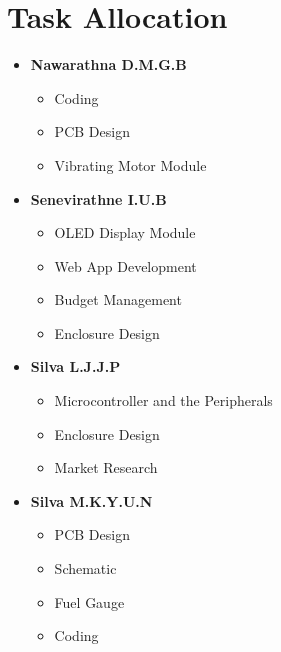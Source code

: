\documentclass{article}
\begin{document}
        \section{Task Allocation}

        \begin{itemize}
            \item \textbf{Nawarathna D.M.G.B}
                \begin{itemize}
                    \item Coding
                    \item PCB Design
                    \item Vibrating Motor Module
                \end{itemize}

            \item \textbf{Senevirathne I.U.B}
                \begin{itemize}
                    \item OLED Display Module
                    \item Web App Development
                    \item Budget Management
                    \item Enclosure Design
                \end{itemize}

            \item \textbf{Silva L.J.J.P}
                \begin{itemize}
                    \item Microcontroller and the Peripherals
                    \item Enclosure Design
                    \item Market Research
                \end{itemize}
        
            \item \textbf{Silva M.K.Y.U.N}
                \begin{itemize}
                    \item PCB Design
                    \item Schematic
                    \item Fuel Gauge 
                    \item Coding
                \end{itemize}
        \end{itemize}

        
        
        

        
\end{document}
